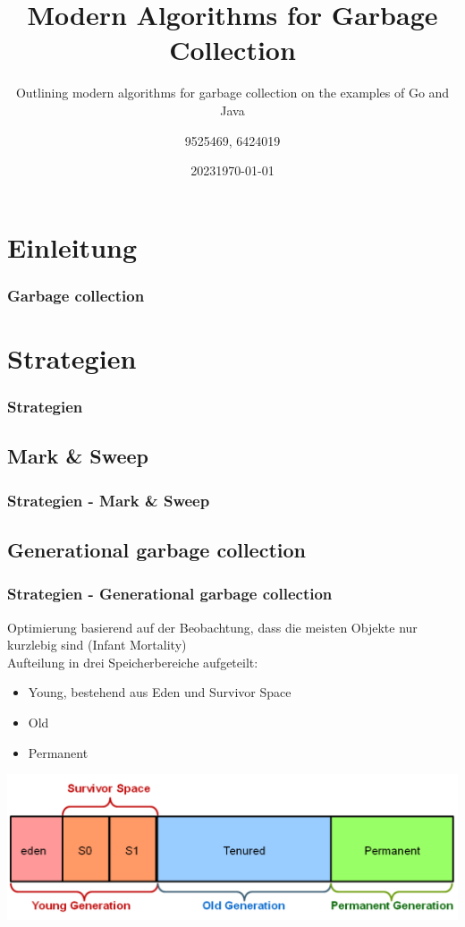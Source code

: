 \documentclass{beamer}
\title{Modern Algorithms for Garbage Collection}
\subtitle{Outlining modern algorithms for garbage collection on the examples of Go and Java}
\date[2023]{2023}
\author{9525469, 6424019}
\institute[DHBW Mosbach]{DHBW Mosbach}
\date{\today}
\begin{document}
    
    \frame{\titlepage}

    \tableofcontents
    
	\section{Einleitung}
        \begin{frame}
            \frametitle{Garbage collection}
        \end{frame}

    \section{Strategien}
        \begin{frame}
            \frametitle{Strategien}
        \end{frame}

        \subsection{Mark \& Sweep}
            \begin{frame}
                \frametitle{Strategien - Mark \& Sweep}
            \end{frame}

        \subsection{Generational garbage collection}
            \begin{frame}
                \frametitle{Strategien - Generational garbage collection}
                Optimierung basierend auf der Beobachtung, dass die meisten Objekte nur kurzlebig sind (Infant Mortality)\\
                Aufteilung in drei Speicherbereiche aufgeteilt:
                \begin{itemize}
                    \item Young, bestehend aus Eden und Survivor Space
                    \item Old
                    \item Permanent
                \end{itemize}
                \includegraphics[width=\textwidth]{images/GenerationalGCHeapStructure.png}
            \end{frame}
\end{document}
